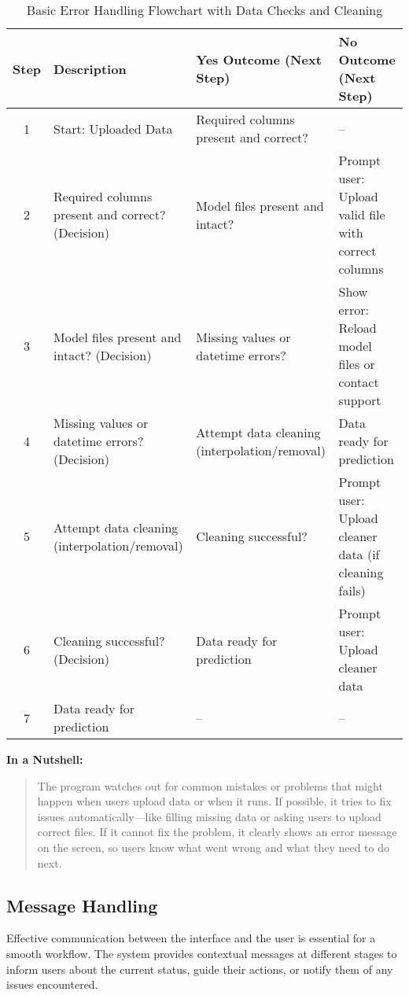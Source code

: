 \begin{table}[ht]
	\centering
	\begin{tabular}{|c|p{5cm}|p{4cm}|p{4cm}|}
		\hline
		\textbf{Step} & \textbf{Description} & \textbf{Yes Outcome (Next Step)} & \textbf{No Outcome (Next Step)} \\
		\hline
		1 & Start: Uploaded Data & Required columns present and correct? & -- \\
		\hline
		2 & Required columns present and correct? (Decision) & Model files present and intact? & Prompt user: Upload valid file with correct columns \\
		\hline
		3 & Model files present and intact? (Decision) & Missing values or datetime errors? & Show error: Reload model files or contact support \\
		\hline
		4 & Missing values or datetime errors? (Decision) & Attempt data cleaning (interpolation/removal) & Data ready for prediction \\
		\hline
		5 & Attempt data cleaning (interpolation/removal) & Cleaning successful? & Prompt user: Upload cleaner data (if cleaning fails) \\
		\hline
		6 & Cleaning successful? (Decision) & Data ready for prediction & Prompt user: Upload cleaner data \\
		\hline
		7 & Data ready for prediction & -- & -- \\
		\hline
	\end{tabular}
	\caption{Basic Error Handling Flowchart with Data Checks and Cleaning }
\end{table}

\vspace{0.3cm}
\noindent
\textbf{In a Nutshell:}

\begin{quote}
	The program watches out for common mistakes or problems that might happen when users upload data or when it runs. If possible, it tries to fix issues automatically—like filling missing data or asking users to upload correct files. If it cannot fix the problem, it clearly shows an error message on the screen, so users know what went wrong and what they need to do next.
\end{quote}

\subsection{Message Handling}

Effective communication between the interface and the user is essential for a smooth workflow. The system provides contextual messages at different stages to inform users about the current status, guide their actions, or notify them of any issues encountered.

